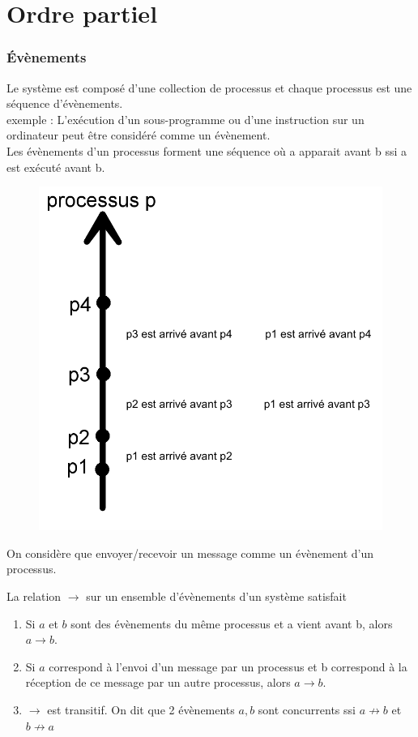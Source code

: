 \documentclass[compress]{beamer}
\begin{document}
\section{Ordre partiel}

\begin{frame}
\frametitle{\'Evènements}
Le système est composé d'une collection de processus et chaque processus est une séquence d'évènements.\\
exemple : L'exécution d'un sous-programme ou d'une instruction sur un ordinateur peut être considéré comme un évènement.\\
Les évènements d'un processus forment une séquence où a apparait avant b ssi a est exécuté avant b.
\begin{figure}
\includegraphics[scale=0.15]{process1.png}
\end{figure}
\end{frame}
\begin{frame}
On considère que envoyer/recevoir un message comme un évènement d'un processus.
\begin{definition}
La relation $\rightarrow$ sur un ensemble d'évènements d'un système satisfait
\begin{enumerate}
\item Si $a$ et $b$ sont des évènements du même processus et a vient avant b, alors $a \rightarrow b$.
\item Si $a$ correspond à l'envoi d'un message par un processus et b correspond à la réception de ce message par un autre processus, alors $a \rightarrow b$.
\item $\rightarrow$ est transitif. On dit que 2 évènements $a, b$ sont concurrents ssi $a \not\rightarrow b$ et $b \not\rightarrow a$
\end{enumerate}
\end{definition}
\end{frame}
\end{document}
